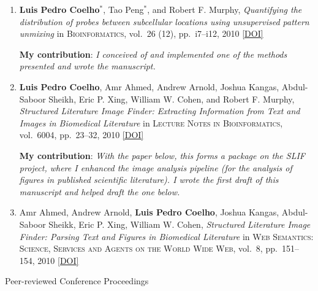 \documentclass{article}
\renewcommand\subsection[1]{%
    \par\vspace{.1em}%
    {\hspace{1em}\subsubhead #1}%
    \par\vspace{.2em}%
}
\newcommand\showdoi[1]{%
    \href{http://dx.doi.org/#1}{[DOI]}%
}
\newcommand\pubname[1]{\textsc{#1}}
\newcommand\contribution[1]{\relax\hfill\break\textbf{My contribution}: \textit{#1}}
\begin{document}
\begin{enumerate}[resume]
\item \textbf{Luis Pedro Coelho}${}^{*}$, Tao Peng${}^{*}$, and Robert F.
Murphy, \emph{Quantifying the distribution of probes between subcellular
locations using unsupervised pattern unmixing} in \pubname{Bioinformatics},
vol.\ 26 (12), pp.\ i7--i12, 2010 \showdoi{10.1093/bioinformatics/btq220}
\contribution{I conceived of and implemented one of the methods presented and
wrote the manuscript.}

\item \textbf{Luis Pedro Coelho}, Amr Ahmed, Andrew Arnold, Joshua Kangas,
Abdul-Saboor Sheikh, Eric P. Xing, William W. Cohen, and Robert F. Murphy,
\emph{Structured Literature Image Finder: Extracting Information from Text and
Images in Biomedical Literature} in \pubname{Lecture Notes in Bioinformatics},
vol.\ 6004, pp.\ 23--32, 2010 \showdoi{10.1007/978-3-642-13131-8_4}
\contribution{With the paper below, this forms a package on the SLIF project,
where I enhanced the image analysis pipeline (for the analysis of figures in
published scientific literature). I wrote the first draft of this manuscript
and helped draft the one below.}

\item Amr Ahmed, Andrew Arnold, \textbf{Luis Pedro Coelho}, Joshua Kangas,
Abdul-Saboor Sheikk, Eric P. Xing, William W. Cohen, \emph{Structured
Literature Image Finder: Parsing Text and Figures in Biomedical Literature} in
\pubname{Web Semantics: Science, Services and Agents on the World Wide Web},
vol.\ 8, pp.\ 151--154, 2010 \showdoi{10.1016/j.websem.2010.04.002}
\end{enumerate}

\subsection{Peer-reviewed Conference Proceedings}
\end{document}
